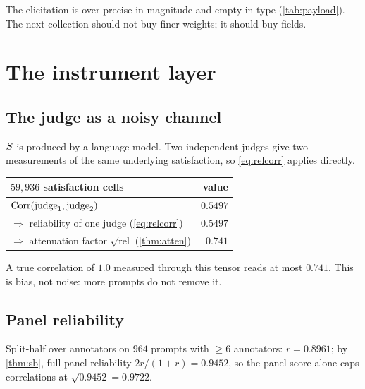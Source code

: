 \begin{corollary}
The elicitation is over-precise in magnitude and empty in type
(\cref{tab:payload}). The next collection should not buy finer weights; it should
buy fields.
\end{corollary}

\section{The instrument layer}
\label{sec:instrument}

\subsection{The judge as a noisy channel}

$S$ is produced by a language model. Two independent judges give two
measurements of the same underlying satisfaction, so \cref{eq:relcorr} applies
directly.

\begin{table}[H]\centering\small
\begin{tabular}{lr}
\toprule
$59{,}936$ satisfaction cells & value\\
\midrule
$\operatorname{Corr}(\text{judge}_1,\text{judge}_2)$ & $0.5497$\\
$\Rightarrow$ reliability of one judge (\cref{eq:relcorr}) & $0.5497$\\
$\Rightarrow$ attenuation factor $\sqrt{\mathrm{rel}}$ (\cref{thm:atten}) & $0.741$\\
\bottomrule
\end{tabular}
\label{tab:channel}
\end{table}

\begin{corollary}
A true correlation of $1.0$ measured through this tensor reads at most $0.741$.
This is bias, not noise: more prompts do not remove it.
\end{corollary}

\subsection{Panel reliability}

Split-half over annotators on $964$ prompts with $\ge 6$ annotators:
$r = 0.8961$; by \cref{thm:sb}, full-panel reliability
$2r/(1+r) = 0.9452$, so the panel score alone caps correlations at
$\sqrt{0.9452} = 0.9722$.

